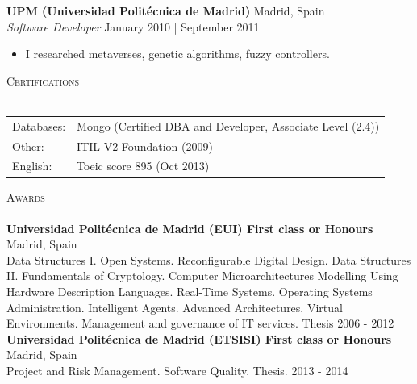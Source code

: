 \documentclass[a4paper]{article}
\newcommand{\lineunder} {
    \vspace*{-8pt} \\
    \hspace*{-18pt} \hrulefill \\
}
\newcommand{\header} [1] {
    {\hspace*{-18pt}\vspace*{6pt} \textsc{#1}}
    \vspace*{-6pt} \lineunder
}
\begin{document}
\textbf{UPM (Universidad Politécnica de Madrid)} \hfill Madrid, Spain\\
\textit{Software Developer} \hfill January 2010 | September 2011\\
\vspace{-1mm}
\begin{itemize} \itemsep 1pt
	\item I researched metaverses, genetic algorithms, fuzzy controllers.
\end{itemize}

\header{Certifications}
\begin{tabular}{ l l }
	Databases:             & Mongo (Certified DBA and Developer, Associate Level (2.4)) \\
	Other:                 & ITIL V2 Foundation (2009)                                  \\
	English:               & Toeic score 895 (Oct 2013)                                 \\
\end{tabular}

\vspace*{2mm}

\vspace*{2mm}

\header{Awards}
\textbf{Universidad Polit\'ecnica de Madrid (EUI) First class or Honours} \hfill Madrid, Spain\\
Data Structures I. Open Systems. Reconfigurable Digital Design. Data Structures II. Fundamentals of Cryptology. Computer Microarchitectures Modelling Using Hardware Description Languages. Real-Time Systems. Operating Systems Administration. Intelligent Agents. Advanced Architectures. Virtual Environments. Management and governance of IT services. Thesis \hfill 2006 - 2012\\
\vspace*{2mm}
\textbf{Universidad Polit\'ecnica de Madrid (ETSISI) First class or Honours} \hfill Madrid, Spain\\
Project and Risk Management. Software Quality. Thesis. \hfill 2013 - 2014\\
\vspace*{2mm}

\ 
\end{document}
